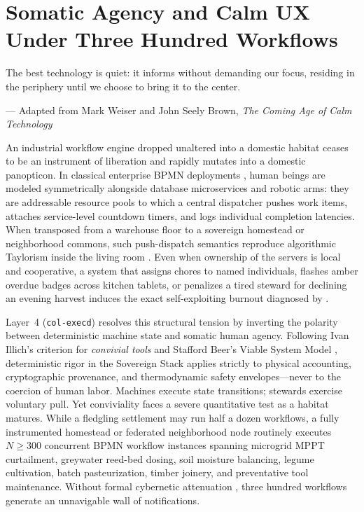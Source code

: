 \chapter{Somatic Agency and Calm UX Under Three Hundred Workflows}
\label{ch:somatic-ux}

\epigraph{The best technology is quiet: it informs without demanding our focus, residing in the periphery until we choose to bring it to the center.}{--- Adapted from Mark Weiser and John Seely Brown, \emph{The Coming Age of Calm Technology} \parencite{weiser1996calm}}

An industrial workflow engine dropped unaltered into a domestic habitat ceases to be an instrument of liberation and rapidly mutates into a domestic panopticon. In classical enterprise BPMN deployments \parencite{omg2011bpmn,vanderaalst2016process}, human beings are modeled symmetrically alongside database microservices and robotic arms: they are addressable resource pools to which a central dispatcher pushes work items, attaches service-level countdown timers, and logs individual completion latencies. When transposed from a warehouse floor to a sovereign homestead or neighborhood commons, such push-dispatch semantics reproduce algorithmic Taylorism inside the living room \parencite{scott1998,zuboff2019}. Even when ownership of the servers is local and cooperative, a system that assigns chores to named individuals, flashes amber overdue badges across kitchen tablets, or penalizes a tired steward for declining an evening harvest induces the exact self-exploiting burnout diagnosed by \textcite{han2015}.

Layer~4 (\texttt{col-execd}) resolves this structural tension by inverting the polarity between deterministic machine state and somatic human agency. Following Ivan Illich's criterion for \emph{convivial tools} \parencite{illich1973} and Stafford Beer's Viable System Model \parencite{beer1972,beer1974}, deterministic rigor in the Sovereign Stack applies strictly to physical accounting, cryptographic provenance, and thermodynamic safety envelopes---never to the coercion of human labor. Machines execute state transitions; stewards exercise voluntary pull. Yet conviviality faces a severe quantitative test as a habitat matures. While a fledgling settlement may run half a dozen workflows, a fully instrumented homestead or federated neighborhood node routinely executes $N \ge 300$ concurrent BPMN workflow instances spanning microgrid MPPT curtailment, greywater reed-bed dosing, soil moisture balancing, legume cultivation, batch pasteurization, timber joinery, and preventative tool maintenance. Without formal cybernetic attenuation \parencite{ashby1956}, three hundred workflows generate an unnavigable wall of notifications.


